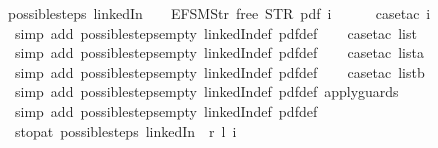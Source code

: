 \begin{isabellebody}
possible{\isacharunderscore}steps\ linkedIn\ {}\ {\isacharless}{}\ {\isacharcolon}{\isacharequal}\ EFSM{\isachardot}Str\ {\isacharprime}{\isacharprime}free{\isacharprime}{\isacharprime}{\isachargreater}\ STR\ {\isacharprime}{\isacharprime}pdf{\isacharprime}{\isacharprime}\ i\ {\isacharequal}\ {\isacharbraceleft}{\isacharbar}{\isacharbar}{\isacharbraceright}{\isachardoublequoteclose}\isanewline
%
\isadelimproof
\ \ %
\endisadelimproof
%
\isatagproof
{}\isamarkupfalse%
\ {\isacharparenleft}case{\isacharunderscore}tac\ i{\isacharparenright}\isanewline
\ \ \ \isamarkupfalse%
\ {\isacharparenleft}simp\ add{\isacharcolon}\ possible{\isacharunderscore}steps{\isacharunderscore}empty\ linkedIn{\isacharunderscore}def\ pdf{\isacharunderscore}def{\isacharparenright}\isanewline
\ \ \isamarkupfalse%
\ {\isacharparenleft}case{\isacharunderscore}tac\ list{\isacharparenright}\isanewline
\ \ \ \isamarkupfalse%
\ {\isacharparenleft}simp\ add{\isacharcolon}\ possible{\isacharunderscore}steps{\isacharunderscore}empty\ linkedIn{\isacharunderscore}def\ pdf{\isacharunderscore}def{\isacharparenright}\isanewline
\ \ \isamarkupfalse%
\ {\isacharparenleft}case{\isacharunderscore}tac\ lista{\isacharparenright}\isanewline
\ \ \ \isamarkupfalse%
\ {\isacharparenleft}simp\ add{\isacharcolon}\ possible{\isacharunderscore}steps{\isacharunderscore}empty\ linkedIn{\isacharunderscore}def\ pdf{\isacharunderscore}def{\isacharparenright}\isanewline
\ \ \isamarkupfalse%
\ {\isacharparenleft}case{\isacharunderscore}tac\ listb{\isacharparenright}\isanewline
\ \ \isamarkupfalse%
\ {\isacharparenleft}simp\ add{\isacharcolon}\ possible{\isacharunderscore}steps{\isacharunderscore}empty\ linkedIn{\isacharunderscore}def\ pdf{\isacharunderscore}def\ apply{\isacharunderscore}guards{\isacharparenright}\isanewline
\ \ \isamarkupfalse%
\ {\isacharparenleft}simp\ add{\isacharcolon}\ possible{\isacharunderscore}steps{\isacharunderscore}empty\ linkedIn{\isacharunderscore}def\ pdf{\isacharunderscore}def{\isacharparenright}%
\endisatagproof
{\isafoldproof}%
%
\isadelimproof
\isanewline
%
\endisadelimproof
\isanewline
{}\isamarkupfalse%
\ stop{\isacharunderscore}at{\isacharunderscore}{}{\isacharcolon}\ {\isachardoublequoteopen}possible{\isacharunderscore}steps\ linkedIn\ {}\ r\ l\ i\ {\isacharequal}\ {\isacharbraceleft}{\isacharbar}{\isacharbar}{\isacharbraceright}{\isachardoublequoteclose}\isanewline

\end{isabellebody}
